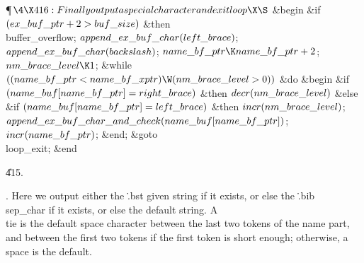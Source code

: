 \Y\P$\4\X416:Finally output a special character and exit loop\X\S$\6
\&{begin} \&{if} $(\\{ex\_buf\_ptr}+2>\\{buf\_size})$ \1\&{then}\5
\\{buffer\_overflow};\2\6
$\\{append\_ex\_buf\_char}(\\{left\_brace})$;\5
$\\{append\_ex\_buf\_char}(\\{backslash})$;\5
$\\{name\_bf\_ptr}\K\\{name\_bf\_ptr}+2$;\5
$\\{nm\_brace\_level}\K1$;\6
\&{while} $((\\{name\_bf\_ptr}<\\{name\_bf\_xptr})\W(\\{nm\_brace\_level}>0))$ %
\1\&{do}\6
\&{begin} \&{if} $(\\{name\_buf}[\\{name\_bf\_ptr}]=\\{right\_brace})$ \1%
\&{then}\5
$\\{decr}(\\{nm\_brace\_level})$\6
\4\&{else} \&{if} $(\\{name\_buf}[\\{name\_bf\_ptr}]=\\{left\_brace})$ \1%
\&{then}\5
$\\{incr}(\\{nm\_brace\_level})$;\2\2\6
$\\{append\_ex\_buf\_char\_and\_check}(\\{name\_buf}[\\{name\_bf\_ptr}])$;\5
$\\{incr}(\\{name\_bf\_ptr})$;\6
\&{end};\2\6
\&{goto} \\{loop\_exit};\6
\&{end}\par
\U415.\fi

.
Here we output either the \.{.bst} given string if it exists, or else
the \.{.bib} \\{sep\_char} if it exists, or else the default string.  A
\\{tie} is the default space character between the last two tokens of
the name part, and between the first two tokens if the first token is
short enough; otherwise, a \\{space} is the default.

